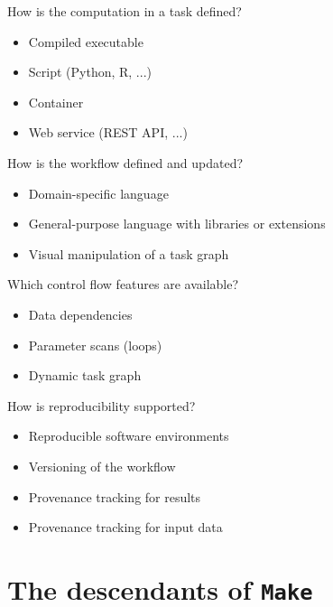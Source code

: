 \documentclass[aspectratio=169]{beamer}
\begin{document}
\begin{frame}{How is the computation in a task defined?}

  \begin{itemize}
  \item Compiled executable
  \item Script (Python, R, ...)
  \item Container
  \item Web service (REST API, ...)
  \end{itemize}

\end{frame}

\begin{frame}{How is the workflow defined and updated?}

  \begin{itemize}
  \item Domain-specific language
  \item General-purpose language with libraries or extensions
  \item Visual manipulation of a task graph
  \end{itemize}

\end{frame}

\begin{frame}{Which control flow features are available?}

  \begin{itemize}
  \item Data dependencies
  \item Parameter scans (loops)
  \item Dynamic task graph
  \end{itemize}

\end{frame}

\begin{frame}{How is reproducibility supported?}

  \begin{itemize}
  \item Reproducible software environments
  \item Versioning of the workflow
  \item Provenance tracking for results
  \item Provenance tracking for input data
  \end{itemize}

\end{frame}

\section*{The descendants of \texttt{Make}}
\end{document}
